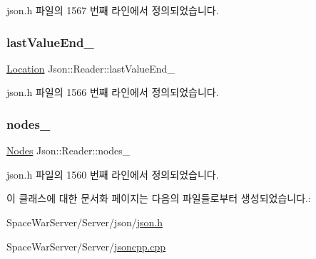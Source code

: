 json.\+h 파일의 1567 번째 라인에서 정의되었습니다.

\mbox{\label{class_json_1_1_reader_a497a114f7b760f1b794b8fff9876615a}} 
\subsubsection{\texorpdfstring{last\+Value\+End\+\_\+}{lastValueEnd\_}}
{\footnotesize\ttfamily \hyperlink{class_json_1_1_reader_a46795b5b272bf79a7730e406cb96375a}{Location} Json\+::\+Reader\+::last\+Value\+End\+\_\+\hspace{0.3cm}{\ttfamily [private]}}



json.\+h 파일의 1566 번째 라인에서 정의되었습니다.

\mbox{\label{class_json_1_1_reader_ada3d2c47699dad662e6d156c8c78a6ac}} 
\subsubsection{\texorpdfstring{nodes\+\_\+}{nodes\_}}
{\footnotesize\ttfamily \hyperlink{class_json_1_1_reader_a8da2114fe8b8124d41ea2f3434f0171b}{Nodes} Json\+::\+Reader\+::nodes\+\_\+\hspace{0.3cm}{\ttfamily [private]}}



json.\+h 파일의 1560 번째 라인에서 정의되었습니다.



이 클래스에 대한 문서화 페이지는 다음의 파일들로부터 생성되었습니다.\+:\begin{DoxyCompactItemize}
\item 
Space\+War\+Server/\+Server/json/\hyperlink{json_8h}{json.\+h}\item 
Space\+War\+Server/\+Server/\hyperlink{jsoncpp_8cpp}{jsoncpp.\+cpp}\end{DoxyCompactItemize}
